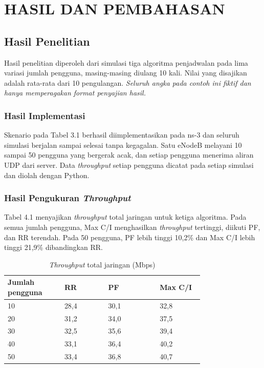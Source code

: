 \chapter{HASIL DAN PEMBAHASAN}

\section{Hasil Penelitian}
Hasil penelitian diperoleh dari simulasi tiga algoritma penjadwalan pada lima variasi jumlah pengguna, masing-masing diulang 10 kali. Nilai yang disajikan adalah rata-rata dari 10 pengulangan. \textit{Seluruh angka pada contoh ini fiktif dan hanya memperagakan format penyajian hasil.}

\subsection{Hasil Implementasi}
Skenario pada Tabel 3.1 berhasil diimplementasikan pada ns-3 dan seluruh simulasi berjalan sampai selesai tanpa kegagalan. Satu eNodeB melayani 10 sampai 50 pengguna yang bergerak acak, dan setiap pengguna menerima aliran UDP dari server. Data \textit{throughput} setiap pengguna dicatat pada setiap simulasi dan diolah dengan Python.

\subsection{Hasil Pengukuran \textit{Throughput}}
\needspace{8cm}
Tabel 4.1 menyajikan \textit{throughput} total jaringan untuk ketiga algoritma. Pada semua jumlah pengguna, Max C/I menghasilkan \textit{throughput} tertinggi, diikuti PF, dan RR terendah. Pada 50 pengguna, PF lebih tinggi 10,2\% dan Max C/I lebih tinggi 21,9\% dibandingkan RR.

\begin{singlespace}
\begin{longtable}{|p{0.22\linewidth}|p{0.17\linewidth}|p{0.2\linewidth}|p{0.17\linewidth}|}
\caption{\textit{Throughput} total jaringan (Mbps)}\\
\hline
\textbf{Jumlah pengguna} & \textbf{RR} & \textbf{PF} & \textbf{Max C/I} \\
\hline
10 & 28,4 & 30,1 & 32,8 \\
\hline
20 & 31,2 & 34,0 & 37,5 \\
\hline
30 & 32,5 & 35,6 & 39,4 \\
\hline
40 & 33,1 & 36,4 & 40,2 \\
\hline
50 & 33,4 & 36,8 & 40,7 \\
\hline
\end{longtable}
\end{singlespace}

